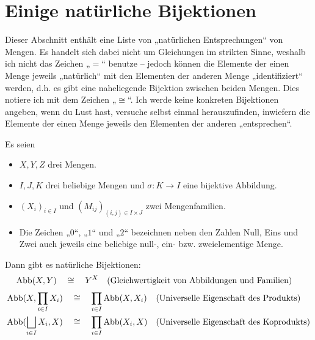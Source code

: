 \section{Einige natürliche Bijektionen}
Dieser Abschnitt enthält eine Liste von „natürlichen Entsprechungen“ von Mengen. Es handelt sich dabei nicht um Gleichungen im strikten Sinne, weshalb ich nicht das Zeichen „$=$“ benutze -- jedoch können die Elemente der einen Menge jeweils „natürlich“ mit den Elementen der anderen Menge „identifiziert“ werden, d.h. es gibt eine naheliegende Bijektion zwischen beiden Mengen. Dies notiere ich mit dem Zeichen „$\cong$“. Ich werde keine konkreten Bijektionen angeben, wenn du Lust hast, versuche selbst einmal herauszufinden, inwiefern die Elemente der einen Menge jeweils den Elementen der anderen „entsprechen“.

Es seien
\begin{itemize}
    \item $X,Y,Z$ drei Mengen.
    \item $I,J,K$ drei beliebige Mengen und $\sigma : K\to I$ eine bijektive Abbildung.
    \item $(X_i)_{i\in I}$ und $(M_{ij})_{(i,j)\in I\times J}$ zwei Mengenfamilien.
    \item Die Zeichen „$0$“, „$1$“ und „$2$“ bezeichnen neben den Zahlen Null, Eins und Zwei auch jeweils eine beliebige null-, ein- bzw. zweielementige Menge.
\end{itemize}
Dann gibt es natürliche Bijektionen:
\begingroup
\allowdisplaybreaks
\begin{align*}
    \operatorname{Abb}(X,Y) & \quad\cong\quad Y^X && (\text{Gleichwertigkeit von Abbildungen und Familien})
\end{align*}
\begin{align*}
    \operatorname{Abb}(X,\prod_{i\in I} X_i) & \quad\cong\quad \prod_{i\in I} \operatorname{Abb}(X,X_i) && (\text{Universelle Eigenschaft des Produkts}) \\
    \operatorname{Abb}(\bigsqcup_{i\in I} X_i,X) & \quad\cong\quad \prod_{i\in I} \operatorname{Abb}(X_i,X) && (\text{Universelle Eigenschaft des Koprodukts})
\end{align*}
